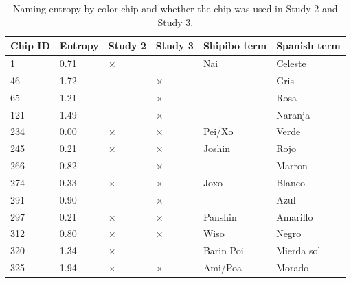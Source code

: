 \documentclass[
  english,
  ,man,floatsintext]{apa6}
\begin{document}
\begin{table}[tbp]

\begin{center}
\begin{threeparttable}

\caption{\label{tab:study1-entropy-table}Naming entropy by color chip and whether the chip was used in Study 2 and Study 3.}

\begin{tabular}{llllll}
\toprule
Chip ID & \multicolumn{1}{c}{Entropy} & \multicolumn{1}{c}{Study 2} & \multicolumn{1}{c}{Study 3} & \multicolumn{1}{c}{Shipibo term} & \multicolumn{1}{c}{Spanish term}\\
\midrule
1 & 0.71 & × &  & Nai & Celeste\\
46 & 1.72 &  & × & - & Gris\\
65 & 1.21 &  & × & - & Rosa\\
121 & 1.49 &  & × & - & Naranja\\
234 & 0.00 & × & × & Pei/Xo & Verde\\
245 & 0.21 & × & × & Joshin & Rojo\\
266 & 0.82 &  & × & - & Marron\\
274 & 0.33 & × & × & Joxo & Blanco\\
291 & 0.90 &  & × & - & Azul\\
297 & 0.21 & × & × & Panshin & Amarillo\\
312 & 0.80 & × & × & Wiso & Negro\\
320 & 1.34 & × &  & Barin Poi & Mierda sol\\
325 & 1.94 & × & × & Ami/Poa & Morado\\
\bottomrule
\end{tabular}

\end{threeparttable}
\end{center}

\end{table}
\end{document}
